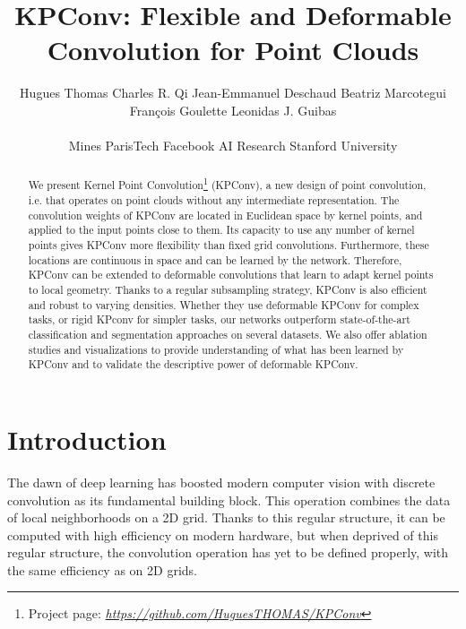 \documentclass[10pt,twocolumn,letterpaper]{article}
\begin{document}
\title{KPConv: Flexible and Deformable Convolution for Point Clouds}

\author{
Hugues Thomas
\quad
Charles R. Qi
\quad
Jean-Emmanuel Deschaud
\quad
Beatriz Marcotegui
\\
Fran\c{c}ois Goulette
\quad
Leonidas J. Guibas
\\
\\
Mines ParisTech \quad Facebook AI Research \quad Stanford University
}



\maketitle

\ificcvfinal\thispagestyle{empty}\fi


\begin{abstract}
We present Kernel Point Convolution\footnote{Project page: \textit{\url{https://github.com/HuguesTHOMAS/KPConv}}} (KPConv), a new design of point convolution, i.e. that operates on point clouds without any intermediate representation. The convolution weights of KPConv are located in Euclidean space by kernel points, and applied to the input points close to them. Its capacity to use any number of kernel points gives KPConv more flexibility than fixed grid convolutions. Furthermore, these locations are continuous in space and can be learned by the network. Therefore, KPConv can be extended to deformable convolutions that learn to adapt kernel points to local geometry. Thanks to a regular subsampling strategy, KPConv is also efficient and robust to varying densities. Whether they use deformable KPConv for complex tasks, or rigid KPconv for simpler tasks, our networks outperform state-of-the-art classification and segmentation approaches on several datasets. We also offer ablation studies and visualizations to provide understanding of what has been learned by KPConv and to validate the descriptive power of deformable KPConv.
\end{abstract}

\section{Introduction}

The dawn of deep learning has boosted modern computer vision with discrete convolution as its fundamental building block. This operation combines the data of local neighborhoods on a 2D grid. Thanks to this regular structure, it can be computed with high efficiency on modern hardware, but when deprived of this regular structure, the convolution operation has yet to be defined properly, with the same efficiency as on 2D grids. 
\end{document}
